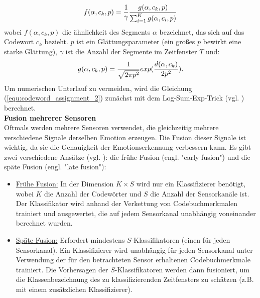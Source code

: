 \begin{equation} 
\Large{ {f(\alpha,c_k,p) = \frac{1}{\gamma}} \frac{g(\alpha,c_k,p)}{\sum_{i=1}^{K} g(\alpha,c_i,p)}}
\end{equation}
\newline
wobei $f(\alpha,c_k,p)$ die {\"a}hnlichkeit des Segments $\alpha$ bezeichnet, das sich auf das Codewort $c_k$ bezieht. $p$ ist ein Gl{\"a}ttungsparameter (ein gro{\ss}es $p$ bewirkt eine starke Gl{\"a}ttung), $\gamma$ ist die Anzahl der Segmente im Zeitfenster $T$ und: \\
\begin{equation} 
\Large{ { g(\alpha,c_k,p) = \frac{1}{\sqrt{2 \pi p^{ 2 }}}} exp(\frac{d(\alpha,c_k)}{2p^{2}}). }
\label{equ:codeword_assignment_2} \end{equation}
\newline
Um numerischen Unterlauf zu vermeiden, wird die Gleichung (\ref{equ:codeword_assignment_2}) zun{\"a}chst mit dem Log-Sum-Exp-Trick (vgl. \cite{murphy_2012}) berechnet. \\


\textbf{Fusion mehrerer Sensoren \\}
Oftmals werden mehrere Sensoren verwendet, die gleichzeitig mehrere verschiedene Signale derselben Emotion erzeugen.
Die Fusion dieser Signale ist wichtig, da sie die Genauigkeit der Emotionserkennung verbessern kann.
Es gibt zwei verschiedene Ans{\"a}tze (vgl. \cite{snoek_2005}): die fr{\"u}he Fusion (engl. "early fusion") und die sp{\"a}te Fusion (engl. "late fusion"): 

\begin{itemize}
  \item \underline{Fr{\"u}he Fusion:} In der Dimension $K \times S$ wird nur ein Klassifizierer ben{\"o}tigt, wobei $K$ die Anzahl der Codew{\"o}rter und $S$ die Anzahl der Sensorkan{\"a}le ist. Der Klassifikator wird anhand der Verkettung von Codebuchmerkmalen trainiert und ausgewertet, die auf jedem Sensorkanal unabh{\"a}ngig voneinander berechnet wurden.

  \item \underline{Sp{\"a}te Fusion:} Erfordert mindestens $S$-Klassifikatoren (einen f{\"u}r jeden Sensorkanal). Ein Klassifizierer wird unabh{\"a}ngig f{\"u}r jeden Sensorkanal unter Verwendung der f{\"u}r den betrachteten Sensor erhaltenen Codebuchmerkmale trainiert. Die Vorhersagen der $S$-Klassifikatoren werden dann fusioniert, um die Klassenbezeichnung des zu klassifizierenden Zeitfensters zu sch{\"a}tzen (z.B. mit einem zus{\"a}tzlichen Klassifizierer).
\end{itemize} \vspace{0.5cm}


